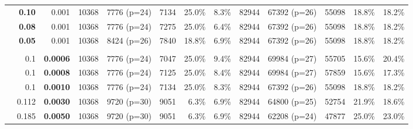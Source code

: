 \begin{table*}[p]
\begin{tabular}{l|rr|rrrrr|rrrrr}
    & \textbf{0.10} & 0.001  & 10368 & 7776 (p=24) & 7134 & 25.0\% & 8.3\% & 82944 & 67392 (p=26) & 55098 & 18.8\% & 18.2\% \\
    
    & \textbf{0.08} & 0.001  & 10368 & 7776 (p=24) & 7275 & 25.0\% & 6.4\% & 82944 & 67392 (p=26) & 55098 & 18.8\% & 18.2\% \\
    
    & \textbf{0.05} & 0.001  & 10368 & 8424 (p=26) & 7840 & 18.8\% & 6.9\% & 82944 & 67392 (p=26) & 55098 & 18.8\% & 18.2\% \\
    
    & & & & & & & & & & & &\\
    
    & 0.1 & \textbf{0.0006}  & 10368 & 7776 (p=24) & 7047 & 25.0\% & 9.4\% & 82944 & 69984 (p=27) & 55705 & 15.6\% & 20.4\% \\
    
    & 0.1 & \textbf{0.0008}  & 10368 & 7776 (p=24) & 7125 & 25.0\% & 8.4\% & 82944 & 69984 (p=27) & 57859 & 15.6\% & 17.3\% \\
    
    & 0.1 & \textbf{0.0010}  & 10368 & 7776 (p=24) & 7134 & 25.0\% & 8.3\% & 82944 & 67392 (p=26) & 55098 & 18.8\% & 18.2\% \\
    
    & 0.112 & \textbf{0.0030}  & 10368 &  9720 (p=30) & 9051 & 6.3\% & 6.9\% & 82944 & 64800 (p=25) & 52754 & 21.9\% & 18.6\% \\
    
    & 0.185 &\textbf{0.0050}  & 10368 & 9720 (p=30) & 9051 & 6.3\% & 6.9\% & 82944 & 62208 (p=24) & 47877 & 25.0\%& 23.0\% \\
    \bottomrule
  \end{tabular}
\end{table*}